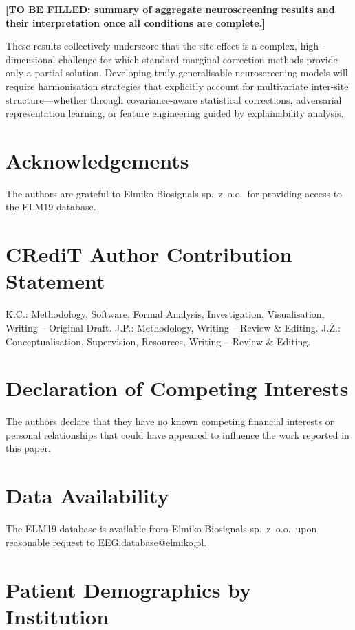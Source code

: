 \documentclass[preprint,12pt]{elsarticle}
\begin{document}
\textbf{[TO BE FILLED: summary of aggregate neuroscreening results
and their interpretation once all conditions are complete.]}

These results collectively underscore that the site effect is a
complex, high-dimensional challenge for which standard marginal
correction methods provide only a partial solution.
Developing truly generalisable neuroscreening models will require
harmonisation strategies that explicitly account for multivariate
inter-site structure---whether through covariance-aware statistical
corrections, adversarial representation learning, or feature
engineering guided by explainability analysis.

\section*{Acknowledgements}
The authors are grateful to Elmiko Biosignals sp.~z~o.o.\ for
providing access to the ELM19 database.

\section*{CRediT Author Contribution Statement}
K.C.: Methodology, Software, Formal Analysis, Investigation,
Visualisation, Writing -- Original Draft.
J.P.: Methodology, Writing -- Review \& Editing.
J.\.Z.: Conceptualisation, Supervision, Resources, Writing --
Review \& Editing.

\section*{Declaration of Competing Interests}
The authors declare that they have no known competing financial
interests or personal relationships that could have appeared to
influence the work reported in this paper.

\section*{Data Availability}
The ELM19 database is available from Elmiko Biosignals sp.~z~o.o.\
upon reasonable request to
\href{mailto:EEG.database@elmiko.pl}{EEG.database@elmiko.pl}.

\appendix
\section{Patient Demographics by Institution}
\label{app:demographics}
\end{document}
